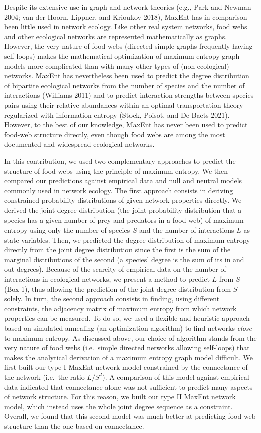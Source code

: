 \documentclass[11pt]{article}
\begin{document}
Despite its extensive use in graph and network theories (e.g., Park and
Newman 2004; van der Hoorn, Lippner, and Krioukov 2018), MaxEnt has in
comparison been little used in network ecology. Like other real system
networks, food webs and other ecological networks are represented
mathematically as graphs. However, the very nature of food webs
(directed simple graphs frequently having self-loops) makes the
mathematical optimization of maximum entropy graph models more
complicated than with many other types of (non-ecological) networks.
MaxEnt has nevertheless been used to predict the degree distribution of
bipartite ecological networks from the number of species and the number
of interactions (Williams 2011) and to predict interaction strengths
between species pairs using their relative abundances within an optimal
transportation theory regularized with information entropy (Stock,
Poisot, and De Baets 2021). However, to the best of our knowledge,
MaxEnt has never been used to predict food-web structure directly, even
though food webs are among the most documented and widespread ecological
networks.

In this contribution, we used two complementary approaches to predict
the structure of food webs using the principle of maximum entropy. We
then compared our predictions against empirical data and null and
neutral models commonly used in network ecology. The first approach
consists in deriving constrained probability distributions of given
network properties directly. We derived the joint degree distribution
(the joint probability distribution that a species has a given number of
prey and predators in a food web) of maximum entropy using only the
number of species \(S\) and the number of interactions \(L\) as state
variables. Then, we predicted the degree distribution of maximum entropy
directly from the joint degree distribution since the first is the sum
of the marginal distributions of the second (a species' degree is the
sum of its in and out-degrees). Because of the scarcity of empirical
data on the number of interactions in ecological networks, we present a
method to predict \(L\) from \(S\) (Box 1), thus allowing the prediction
of the joint degree distribution from \(S\) solely. In turn, the second
approach consists in finding, using different constraints, the adjacency
matrix of maximum entropy from which network properties can be measured.
To do so, we used a flexible and heuristic approach based on simulated
annealing (an optimization algorithm) to find networks \emph{close} to
maximum entropy. As discussed above, our choice of algorithm stands from
the very nature of food webs (i.e.~simple directed networks allowing
self-loops) that makes the analytical derivation of a maximum entropy
graph model difficult. We first built our type I MaxEnt network model
constrained by the connectance of the network (i.e.~the ratio
\(L/S^2\)). A comparison of this model against empirical data indicated
that connectance alone was not sufficient to predict many aspects of
network structure. For this reason, we built our type II MaxEnt network
model, which instead uses the whole joint degree sequence as a
constraint. Overall, we found that this second model was much better at
predicting food-web structure than the one based on connectance.
\end{document}

